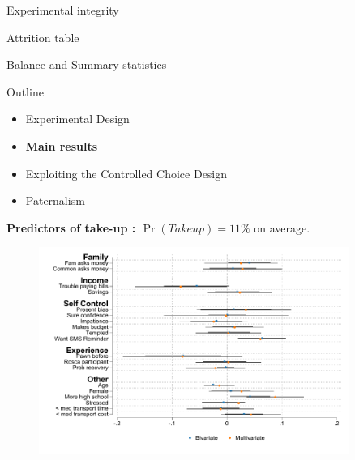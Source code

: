 \documentclass[8pt]{beamer}
\begin{document}
\begin{frame}{Experimental integrity}
\label{experimental_integrity}
    \begin{table}[H]
\caption{Attrition table}
\label{attrition_table}
\begin{center}
\small{}
\end{center}
\end{table}
\end{frame}



\begin{frame}{Balance and Summary statistics}
    \begin{table}[H]
\label{SS}
\begin{center}
\resizebox{.65\textwidth}{!}{
\scriptsize{}
}
\end{center}
\end{table}
\end{frame}






\begin{frame}{Outline}
     \begin{itemize}
         \vfill\item Experimental Design
         \vfill\item \textbf{Main results}
          \vfill\item Exploiting the Controlled Choice Design
         \vfill\item Paternalism 
     \end{itemize}
\end{frame}





\begin{frame}
\textbf{Predictors of take-up : $\Pr(Take up)=11\%$} on average.

\begin{figure}[H]
    \begin{center}
        \includegraphics[width=0.9\textwidth]{Figuras/determinants_choose_commitment.pdf}
    \end{center}
    \end{figure}
\end{frame}
\end{document}
